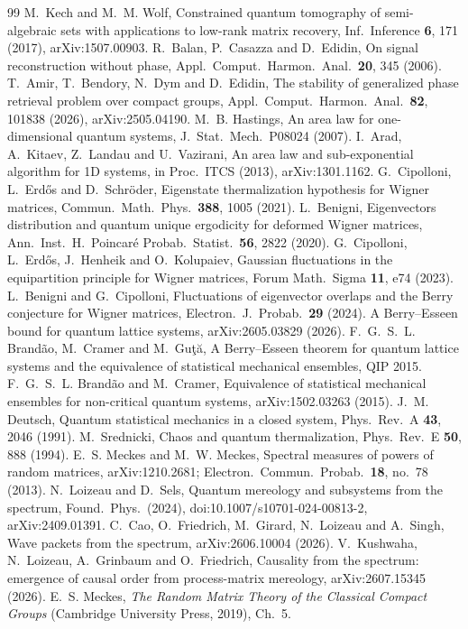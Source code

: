 \documentclass[11pt]{article}
\theoremstyle{definition}
\theoremstyle{remark}
\begin{document}
{\begin{thebibliography}{99}
 M.~Kech and M.~M. Wolf, Constrained quantum tomography of semi-algebraic sets with applications to low-rank matrix recovery, Inf.\ Inference \textbf{6}, 171 (2017), arXiv:1507.00903.
 R.~Balan, P.~Casazza and D.~Edidin, On signal reconstruction without phase, Appl.\ Comput.\ Harmon.\ Anal.\ \textbf{20}, 345 (2006).
 T.~Amir, T.~Bendory, N.~Dym and D.~Edidin, The stability of generalized phase retrieval problem over compact groups, Appl.\ Comput.\ Harmon.\ Anal.\ \textbf{82}, 101838 (2026), arXiv:2505.04190.
 M.~B. Hastings, An area law for one-dimensional quantum systems, J.\ Stat.\ Mech.\ P08024 (2007).
 I.~Arad, A.~Kitaev, Z.~Landau and U.~Vazirani, An area law and sub-exponential algorithm for 1D systems, in Proc.\ ITCS (2013), arXiv:1301.1162.
 G.~Cipolloni, L.~Erd\H{o}s and D.~Schr\"oder, Eigenstate thermalization hypothesis for Wigner matrices, Commun.\ Math.\ Phys.\ \textbf{388}, 1005 (2021).
 L.~Benigni, Eigenvectors distribution and quantum unique ergodicity for deformed Wigner matrices, Ann.\ Inst.\ H.\ Poincar\'e Probab.\ Statist.\ \textbf{56}, 2822 (2020).
 G.~Cipolloni, L.~Erd\H{o}s, J.~Henheik and O.~Kolupaiev, Gaussian fluctuations in the equipartition principle for Wigner matrices, Forum Math.\ Sigma \textbf{11}, e74 (2023).
 L.~Benigni and G.~Cipolloni, Fluctuations of eigenvector overlaps and the Berry conjecture for Wigner matrices, Electron.\ J.\ Probab.\ \textbf{29} (2024).
 A Berry--Esseen bound for quantum lattice systems, arXiv:2605.03829 (2026). %
 F.~G.~S.~L. Brand\~ao, M.~Cramer and M.~Gu\c{t}\u{a}, A Berry--Esseen theorem for quantum lattice systems and the equivalence of statistical mechanical ensembles, QIP 2015.
 F.~G.~S.~L. Brand\~ao and M.~Cramer, Equivalence of statistical mechanical ensembles for non-critical quantum systems, arXiv:1502.03263 (2015).
 J.~M. Deutsch, Quantum statistical mechanics in a closed system, Phys.\ Rev.\ A \textbf{43}, 2046 (1991).
 M.~Srednicki, Chaos and quantum thermalization, Phys.\ Rev.\ E \textbf{50}, 888 (1994).
 E.~S. Meckes and M.~W. Meckes, Spectral measures of powers of random matrices, arXiv:1210.2681; Electron.\ Commun.\ Probab.\ \textbf{18}, no.~78 (2013). %
 N.~Loizeau and D.~Sels, Quantum mereology and subsystems from the spectrum, Found.\ Phys.\ (2024), doi:10.1007/s10701-024-00813-2, arXiv:2409.01391.
 C.~Cao, O.~Friedrich, M.~Girard, N.~Loizeau and A.~Singh, Wave packets from the spectrum, arXiv:2606.10004 (2026).
 V.~Kushwaha, N.~Loizeau, A.~Grinbaum and O.~Friedrich, Causality from the spectrum: emergence of causal order from process-matrix mereology, arXiv:2607.15345 (2026).
 E.~S. Meckes, \emph{The Random Matrix Theory of the Classical Compact Groups} (Cambridge University Press, 2019), Ch.~5.
\end{thebibliography}}
\end{document}
